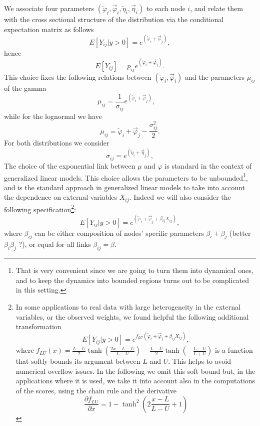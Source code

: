 \documentclass[a4paper,12pt]{article}
\newcommand{\tonde}[1]{\left(#1\right)}
\newcommand{\pt}[1]{\left(#1\right)}
\newcommand{\pq}[1]{\left[#1\right]}
\newcommand{\be}{\begin{equation}}
\newcommand{\ee}{\end{equation}}
\newcommand{\Yij}{{Y_{ij}}}
\newcommand{\Xij}{{X_{ij}}}
\newcommand{\uij}{_{ij}}
\newcommand{\wpar}{\varphi}
\newcommand{\iwpar}{{\overleftarrow{\wpar}}}
\newcommand{\owpar}{{\overrightarrow{\wpar}}}
\newcommand{\wparvar}{\eta}
\newcommand{\iwparvar}{{\overleftarrow{\wparvar}}}
\newcommand{\owparvar}{{\overrightarrow{\wparvar}}}
\begin{document}
We associate four parameters $\pt{\iwpar_i ,\owpar_i, \iwparvar_i ,\owparvar_i}$ to each node $i$, and relate them with the cross sectional structure of the distribution via the conditional expectation matrix as follows
\be\label{eq:cond_mean_phi}
E\pq{\Yij\vert y>0 } =    e^{\tonde{\iwpar_{i} + \owpar_{j}}}, 
\ee
hence 
$$E\pq{\Yij } =   p\uij e^{\tonde{\iwpar_{i} + \owpar_{j}}}.$$
This choice fixes the following relations between $\pt{\iwpar_i ,\owpar_i} $  and the parameters $\mu\uij$ of the gamma
\be
\mu_{ij} = \frac{1}{\sigma\uij} e^{\tonde{\iwpar_{i} + \owpar_{j}}},
\quad 
\ee 
while for the lognormal we have
\be
\mu_{ij} = \iwpar_{i} + \owpar_{j} - \frac{\sigma\uij^2}{2}.
\ee 
For both distributions we consider 
\be
\sigma_{ij} = e^{\tonde{\iwparvar_{i} + \owparvar_{j}}},
\ee
The choice of the exponential link between $\mu$ and $\varphi$ is standard in the context of generalized linear models. This choice allows the parameters to be unbounded\footnote{That  is very convenient since we are going to turn them into dynamical ones, and to keep the dynamics into bounded regions turns out to be complicated in this setting.}, and is the standard approach in generalized linear models to take into account the dependence on external variables $\Xij$. Indeed we will also consider the following specification\footnote{In some applications to real data with large heterogeneity in the external variables, or the observed weights, we found helpful the following additional transformation
	\be\label{eq:cond_mean_phi_and_reg}
	E\pq{\Yij\vert y>0 } =    e^{f_{LU}\tonde{\iwpar_{i} + \owpar_{j} + \beta_{ij} \Xij} }, 
	\ee where $f_{LU}\pt{x} = \frac{L-U}{2} \tanh{\tonde{\frac{2 x - L -U}{L-U}}} - \frac{L-U}{2} \tanh\tonde{-\frac{L-U}{L+U}}$  is a function that softly bounds its argument between $L$ and $U$. This helps to avoid numerical overflow issues.   In the following we omit this soft bound but, in the applications where it is used, we take it into account also in the computations of the scores, using the chain rule and the derivative $$\frac{\partial f_{LU}}{\partial x} = 1 - \tanh^2\tonde{2 \frac{x-L}{L-U} + 1}$$ 
}:  
\be\label{eq:cond_mean_phi_and_reg}
E\pq{\Yij\vert y>0 } =    e^{\tonde{\iwpar_{i} + \owpar_{j} + \beta_{ij} \Xij} }, 
\ee
where $\beta_{ij}$ can be either composition of nodes' specific parameters $\beta_i + \beta_j$ (better $\beta_i \beta_j$ ?), or equal for all links $\beta\uij = \beta$.
\end{document}
